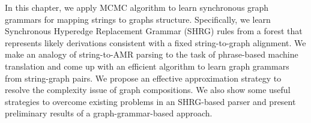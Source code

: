 In this chapter, we apply MCMC algorithm to learn synchronous graph grammars for mapping strings
to graphs structure. Specifically, we learn Synchronous Hyperedge Replacement Grammar (SHRG) rules from a forest that represents likely derivations consistent with a fixed string-to-graph 
alignment. We make an analogy of string-to-AMR parsing to the task of phrase-based machine translation and
come up with an efficient algorithm to learn graph grammars from string-graph pairs. We propose an effective
approximation strategy to resolve the complexity issue of graph compositions. We also show some useful strategies
to overcome existing problems in an SHRG-based parser and present preliminary results of a graph-grammar-based approach. 
%
